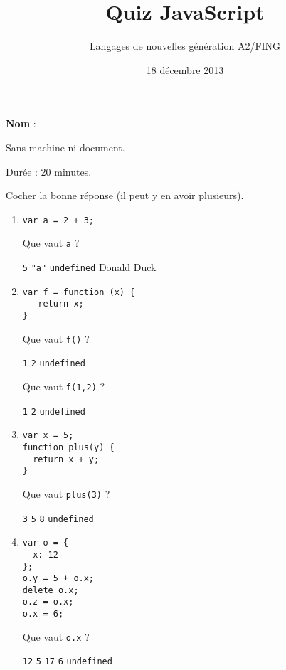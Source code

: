 \documentclass[a4paper, 12pt]{article}
\title{Quiz JavaScript}
\author{Langages de nouvelles génération A2/FING}
\date{18 décembre 2013}
\newcommand{\choice}[1]{\Square\hspace{2pt} #1\hspace{5pt}}
\newcommand{\choicec}[1]{\Square\hspace{2pt} \lstinline{#1}\hspace{5pt}}
\begin{document}
\maketitle


\textbf{Nom} :

Sans machine ni document.

Durée : 20 minutes.

Cocher la bonne réponse (il peut y en avoir plusieurs).

\begin{enumerate}
\item \lstset{language=javascript}
\begin{lstlisting}
var a = 2 + 3;
\end{lstlisting}

  Que vaut \lstinline{a} ?

  \choicec{5} \choicec{"a"} \choicec{undefined} \choice{Donald Duck}
\item \lstset{language=javascript}
\begin{lstlisting}
var f = function (x) {
   return x;
}
\end{lstlisting}

   Que vaut \lstinline{f()} ?

   \choicec{1} \choicec{2} \choicec{undefined}

   Que vaut \lstinline{f(1,2)} ?

   \choicec{1} \choicec{2} \choicec{undefined}
\item \lstset{language=javascript}
\begin{lstlisting}
var x = 5;
function plus(y) {
  return x + y;
}
\end{lstlisting}

  Que vaut \lstinline{plus(3)} ?

  \choicec{3} \choicec{5} \choicec{8} \choicec{undefined}
\item \lstset{language=javascript}
\begin{lstlisting}
var o = {
  x: 12
};
o.y = 5 + o.x;
delete o.x;
o.z = o.x;
o.x = 6;
\end{lstlisting}

  Que vaut \lstinline{o.x} ?

  \choicec{12} \choicec{5} \choicec{17} \choicec{6} \choicec{undefined}


\end{enumerate}
\end{document}
